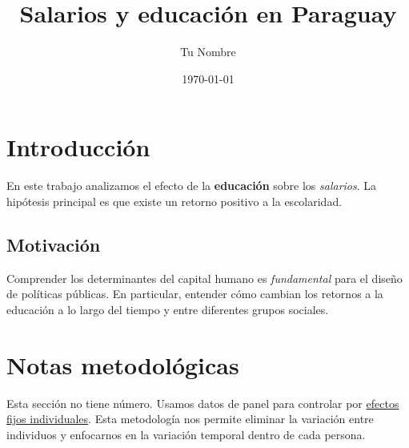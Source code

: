 \documentclass[12pt, a4paper]{article}
\title{Salarios y educación en Paraguay}
\author{Tu Nombre}
\date{\today}
\begin{document}
\maketitle

\section{Introducción}

En este trabajo analizamos el efecto de la \textbf{educación} sobre los 
\textit{salarios}. La hipótesis principal es que existe un retorno positivo 
a la escolaridad.

\subsection{Motivación}

Comprender los determinantes del capital humano es \emph{fundamental} para 
el diseño de políticas públicas. En particular, entender cómo cambian los 
retornos a la educación a lo largo del tiempo y entre diferentes grupos 
sociales.

\section*{Notas metodológicas}

Esta sección no tiene número. Usamos datos de panel para controlar por 
\underline{efectos fijos individuales}. Esta metodología nos permite 
eliminar la variación entre individuos y enfocarnos en la variación 
temporal dentro de cada persona.
\end{document}
